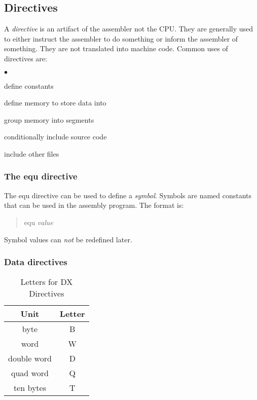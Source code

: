 \subsection{Directives}

A \emph{directive} is an artifact of the assembler not the CPU. They are
generally used to either instruct the assembler to do something or inform
the assembler of something. They are not translated into machine code. Common
uses of directives are:
\begin{list}{$\bullet$}{\setlength{\itemsep}{0pt}}
\item define constants
\item define memory to store data into
\item group memory into segments
\item conditionally include source code
\item include other files
\end{list}

\subsubsection{The equ directive}

The {\code equ} directive can be used to define a \emph{symbol}. Symbols are
named constants that can be used in the assembly program. The format is:
\begin{quote}
   equ {\em value}
\end{quote}
Symbol values can \emph{not} be redefined later.

\subsubsection{Data directives}

\begin{table}[t]
\centering
\begin{tabular}{||c|c||} \hline
{\bf Unit} & {\bf Letter} \\
\hline
byte & B \\
word & W \\
double word & D \\
quad word & Q \\
ten bytes & T \\
\hline
\end{tabular}
\caption{Letters for {\code DX} Directives
         \label{tab:size-letters} }
\end{table}

